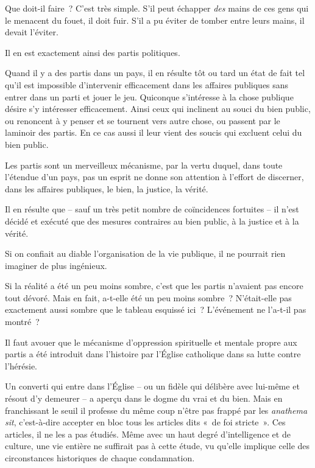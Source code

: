 \documentclass[french,twoside]{book} %
\begin{document}
Que doit-il faire ? C’est très simple. S’il peut échapper \emph{des} mains de ces gens qui le menacent du fouet, il doit fuir. S’il a pu éviter de tomber entre leurs mains, il devait l’éviter.\par
Il en est exactement ainsi des partis politiques.\par
Quand il y a des partis dans un pays, il en résulte tôt ou tard un état de fait tel qu’il est impossible d’intervenir efficacement dans les affaires publiques sans entrer dans un parti et jouer le jeu. Quiconque s’intéresse à la chose publique désire s’y intéresser efficacement. Ainsi ceux qui inclinent au souci du bien public, ou renoncent à y penser et se tournent vers autre chose, ou passent par le laminoir des partis. En ce cas aussi il leur vient des soucis qui excluent celui du bien public.\par
Les partis sont un merveilleux mécanisme, par la vertu duquel, dans toute l’étendue d’un pays, pas un esprit ne donne son attention à l’effort de discerner, dans les affaires publiques, le bien, la justice, la vérité.\par
Il en résulte que – sauf un très petit nombre de coïncidences fortuites – il n’est décidé et exécuté que des mesures contraires au bien public, à la justice et à la vérité.\par
Si on confiait au diable l’organisation de la vie publique, il ne pourrait rien imaginer de plus ingénieux.\par
Si la réalité a été un peu moins sombre, c’est que les partis n’avaient pas encore tout dévoré. Mais en fait, a-t-elle été un peu moins sombre ? N’était-elle pas exactement aussi sombre que le tableau esquissé ici ? L’événement ne l’a-t-il pas montré ?\par
Il faut avouer que le mécanisme d’oppression spirituelle et mentale propre aux partis a été introduit dans l’histoire par l’Église catholique dans sa lutte contre l’hérésie.\par
Un converti qui entre dans l’Église – ou un fidèle qui délibère avec lui-même et résout d’y demeurer – a aperçu dans le dogme du vrai et du bien. Mais en franchissant le seuil il professe du même coup n’être pas frappé par les \emph{anathema sit}, c’est-à-dire accepter en bloc tous les articles dits « de foi stricte ». Ces articles, il ne les a pas étudiés. Même avec un haut degré d’intelligence et de culture, une vie entière ne suffirait pas à cette étude, vu qu’elle implique celle des circonstances historiques de chaque condamnation.\par
\end{document}
